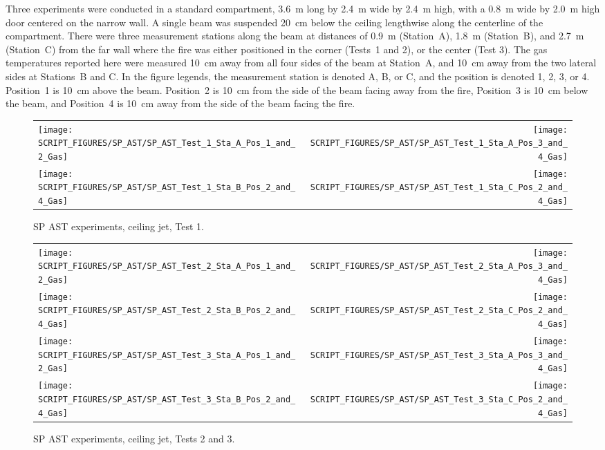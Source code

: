 Three experiments were conducted in a standard compartment, 3.6~m long by 2.4~m wide by 2.4~m high, with a 0.8~m wide by 2.0~m high door centered on the narrow wall. A single beam was suspended 20~cm below the ceiling lengthwise along the centerline of the compartment. There were three measurement stations along the beam at distances of 0.9~m (Station~A), 1.8~m (Station~B), and 2.7~m (Station~C) from the far wall where the fire was either positioned in the corner (Tests~1 and 2), or the center (Test 3). The gas temperatures reported here were measured 10~cm away from all four sides of the beam at Station~A, and 10~cm away from the two lateral sides at Stations~B and C. In the figure legends, the measurement station is denoted A, B, or C, and the position is denoted 1, 2, 3, or 4. Position~1 is 10~cm above the beam. Position~2 is 10~cm from the side of the beam facing away from the fire, Position~3 is 10~cm below the beam, and Position~4 is 10~cm away from the side of the beam facing the fire.

\begin{figure}[!h]
\begin{tabular*}{\textwidth}{l@{\extracolsep{\fill}}r}
\texttt{[image: SCRIPT\_FIGURES/SP\_AST/SP\_AST\_Test\_1\_Sta\_A\_Pos\_1\_and\_2\_Gas]} &
\texttt{[image: SCRIPT\_FIGURES/SP\_AST/SP\_AST\_Test\_1\_Sta\_A\_Pos\_3\_and\_4\_Gas]} \\
\texttt{[image: SCRIPT\_FIGURES/SP\_AST/SP\_AST\_Test\_1\_Sta\_B\_Pos\_2\_and\_4\_Gas]} &
\texttt{[image: SCRIPT\_FIGURES/SP\_AST/SP\_AST\_Test\_1\_Sta\_C\_Pos\_2\_and\_4\_Gas]}
\end{tabular*}
\caption{SP AST experiments, ceiling jet, Test 1.}
\label{SP_Test_1_Gas}
\end{figure}

\newpage

\begin{figure}[p]
\begin{tabular*}{\textwidth}{l@{\extracolsep{\fill}}r}
\texttt{[image: SCRIPT\_FIGURES/SP\_AST/SP\_AST\_Test\_2\_Sta\_A\_Pos\_1\_and\_2\_Gas]} &
\texttt{[image: SCRIPT\_FIGURES/SP\_AST/SP\_AST\_Test\_2\_Sta\_A\_Pos\_3\_and\_4\_Gas]} \\
\texttt{[image: SCRIPT\_FIGURES/SP\_AST/SP\_AST\_Test\_2\_Sta\_B\_Pos\_2\_and\_4\_Gas]} &
\texttt{[image: SCRIPT\_FIGURES/SP\_AST/SP\_AST\_Test\_2\_Sta\_C\_Pos\_2\_and\_4\_Gas]} \\
\texttt{[image: SCRIPT\_FIGURES/SP\_AST/SP\_AST\_Test\_3\_Sta\_A\_Pos\_1\_and\_2\_Gas]} &
\texttt{[image: SCRIPT\_FIGURES/SP\_AST/SP\_AST\_Test\_3\_Sta\_A\_Pos\_3\_and\_4\_Gas]} \\
\texttt{[image: SCRIPT\_FIGURES/SP\_AST/SP\_AST\_Test\_3\_Sta\_B\_Pos\_2\_and\_4\_Gas]} &
\texttt{[image: SCRIPT\_FIGURES/SP\_AST/SP\_AST\_Test\_3\_Sta\_C\_Pos\_2\_and\_4\_Gas]}
\end{tabular*}
\caption{SP AST experiments, ceiling jet, Tests 2 and 3.}
\label{SP_Test_2_3_Gas}
\end{figure}


